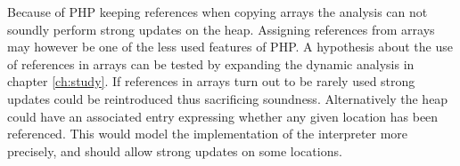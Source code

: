 Because of PHP keeping references when copying arrays the analysis can not soundly perform strong updates on the heap. Assigning references from arrays may however be one of the less used features of PHP. A hypothesis about the use of references in arrays can be tested by expanding the dynamic analysis in chapter \ref{ch:study}. If references in arrays turn out to be rarely used strong updates could be reintroduced thus sacrificing soundness. Alternatively the heap could have an associated entry expressing whether any given location has been referenced. This would model the implementation of the interpreter more precisely, and should allow strong updates on some locations.


 